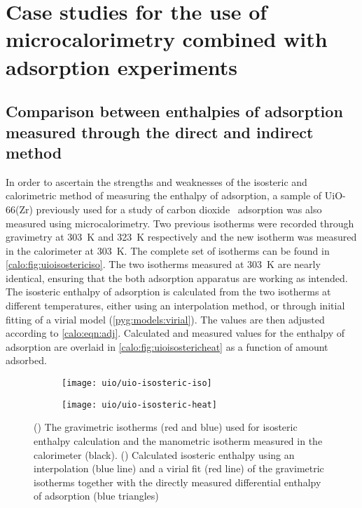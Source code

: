 
\section{Case studies for the use of 
microcalorimetry combined with adsorption experiments}

\subsection{Comparison between enthalpies of adsorption measured
	through the direct and indirect method}

In order to ascertain the strengths and weaknesses of the isosteric 
and calorimetric method of measuring the enthalpy of adsorption, 
a sample of UiO-66(Zr) previously used for a study of 
carbon dioxide~\cite{wiersumEvaluationUiO66GasBased2011} adsorption
was also measured using microcalorimetry.
Two previous isotherms were recorded through gravimetry at \SI{303}{\kelvin} and
\SI{323}{\kelvin} respectively and the new isotherm was measured in the 
calorimeter at \SI{303}{\kelvin}. The complete set of isotherms can
be found in \autoref{calo:fig:uioisostericiso}.
The two isotherms measured at \SI{303}{\kelvin} are nearly identical, 
ensuring that the both adsorption apparatus are working as intended.
The isosteric enthalpy of adsorption is calculated from the two isotherms
at different temperatures, either using an interpolation method, or through
initial fitting of a virial model (\autoref{pyg:models:virial}).
The values are then adjusted according to \autoref{calo:eqn:adj}.
Calculated and measured values for the enthalpy of adsorption are overlaid
in \autoref{calo:fig:uioisostericheat} as a function of amount adsorbed.

\begin{figure}[htb]
	\centering

	\begin{subfigure}[b]{.5\textwidth}
		\centering
		\texttt{[image: uio/uio-isosteric-iso]}
		\caption{}%
		\label{calo:fig:uioisostericiso}
	\end{subfigure}%
	\begin{subfigure}[b]{.5\textwidth}
		\centering
		\texttt{[image: uio/uio-isosteric-heat]}
		\caption{}%
		\label{calo:fig:uioisostericheat}
	\end{subfigure}
	\caption{(\protect{})
		The gravimetric isotherms (red and blue) used for isosteric enthalpy
		calculation and the manometric isotherm measured in the calorimeter (black).
		(\protect{}) Calculated
		isosteric enthalpy using an interpolation (blue line) and a
		virial fit (red line) of the gravimetric isotherms together with
		the directly measured differential enthalpy of adsorption (blue triangles)}%
	\label{calo:fig:uioisosteric}

\end{figure}

